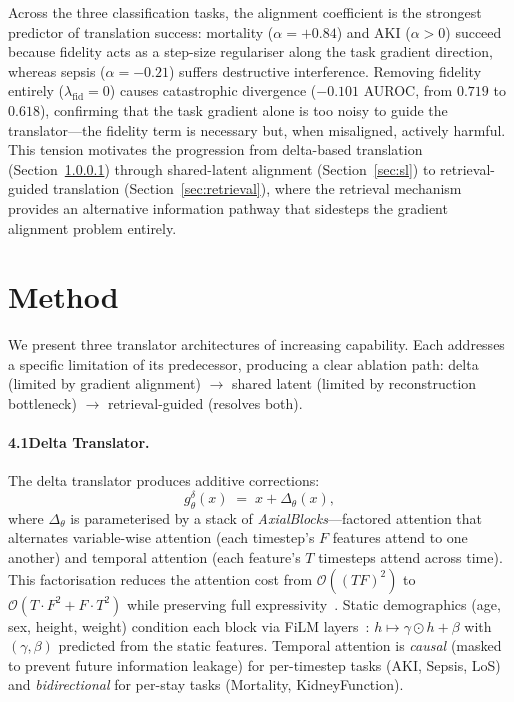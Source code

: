 Across the three classification tasks, the alignment coefficient is the strongest predictor of translation success: mortality ($\alpha = +0.84$) and AKI ($\alpha > 0$) succeed because fidelity acts as a step-size regulariser along the task gradient direction, whereas sepsis ($\alpha = -0.21$) suffers destructive interference.
Removing fidelity entirely ($\lambda_{\mathrm{fid}} = 0$) causes catastrophic divergence ($-0.101$ AUROC, from $0.719$ to $0.618$), confirming that the task gradient alone is too noisy to guide the translator---the fidelity term is necessary but, when misaligned, actively harmful.
This tension motivates the progression from delta-based translation (Section~\ref{sec:delta}) through shared-latent alignment (Section~\ref{sec:sl}) to retrieval-guided translation (Section~\ref{sec:retrieval}), where the retrieval mechanism provides an alternative information pathway that sidesteps the gradient alignment problem entirely.

\section{Method}
\label{sec:method}

We present three translator architectures of increasing capability. Each addresses a specific limitation of its predecessor, producing a clear ablation path: delta (limited by gradient alignment) $\to$ shared latent (limited by reconstruction bottleneck) $\to$ retrieval-guided (resolves both).

\paragraph{4.1\quad Delta Translator.}
\label{sec:delta}
The delta translator produces additive corrections:
\begin{equation}
\label{eq:delta}
g_\theta^{\delta}(x) \;=\; x + \Delta_\theta(x),
\end{equation}
where $\Delta_\theta$ is parameterised by a stack of \emph{AxialBlocks}---factored attention that alternates variable-wise attention (each timestep's $F$ features attend to one another) and temporal attention (each feature's $T$ timesteps attend across time).
This factorisation reduces the attention cost from $\mathcal{O}((TF)^2)$ to $\mathcal{O}(T \cdot F^2 + F \cdot T^2)$ while preserving full expressivity~\cite{ho2019axial}.
Static demographics (age, sex, height, weight) condition each block via FiLM layers~\cite{perez2018film}: $h \mapsto \gamma \odot h + \beta$ with $(\gamma, \beta)$ predicted from the static features.
Temporal attention is \emph{causal} (masked to prevent future information leakage) for per-timestep tasks (AKI, Sepsis, LoS) and \emph{bidirectional} for per-stay tasks (Mortality, KidneyFunction).


